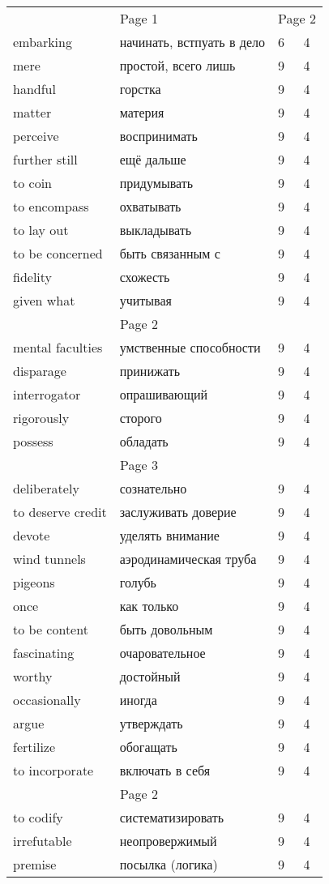\documentclass[12pt]{article}
\begin{document}
\begin{tabular}{ l l | l l | }
  \multicolumn{2}{c|}{Page 1} & \multicolumn{2}{c|}{Page 2} \\
  embarking & начинать, встпуать в дело & 6 & 4\\
  mere & простой, всего лишь & 9 & 4 \\
  handful & горстка & 9 & 4 \\
  matter & материя & 9 & 4 \\
  perceive & воспринимать & 9 & 4 \\
  further still & ещё дальше & 9 & 4 \\
  to coin & придумывать & 9 & 4 \\
  to encompass & охватывать & 9 & 4 \\
  to lay out & выкладывать & 9 & 4 \\
  to be concerned & быть связанным с & 9 & 4 \\
  fidelity & схожесть & 9 & 4 \\
  given what & учитывая & 9 & 4 \\ \cline{1-2}

  \multicolumn{2}{c|}{Page 2} \\
  mental faculties & умственные способности & 9 & 4 \\
  disparage & принижать & 9 & 4 \\
  interrogator & опрашивающий & 9 & 4 \\
  rigorously & сторого & 9 & 4 \\
  possess & обладать & 9 & 4 \\ \cline{1-2}

  \multicolumn{2}{c|}{Page 3} \\
  deliberately & сознательно & 9 & 4 \\
  to deserve credit & заслуживать доверие & 9 & 4 \\
  devote & уделять внимание & 9 & 4 \\
  wind tunnels & аэродинамическая труба & 9 & 4 \\
  pigeons & голубь & 9 & 4 \\
  once & как только & 9 & 4 \\
  to be content & быть довольным & 9 & 4 \\
  fascinating & очаровательное & 9 & 4 \\
  worthy & достойный & 9 & 4 \\
  occasionally & иногда & 9 & 4 \\
  argue & утверждать & 9 & 4 \\
  fertilize  & обогащать & 9 & 4 \\
  to incorporate  & включать в себя & 9 & 4 \\

  \multicolumn{2}{c|}{Page 2} \\
  to codify & систематизировать & 9 & 4 \\
  irrefutable & неопровержимый & 9 & 4 \\
  premise & посылка (логика) & 9 & 4 \\

\end{tabular}
\end{document}
